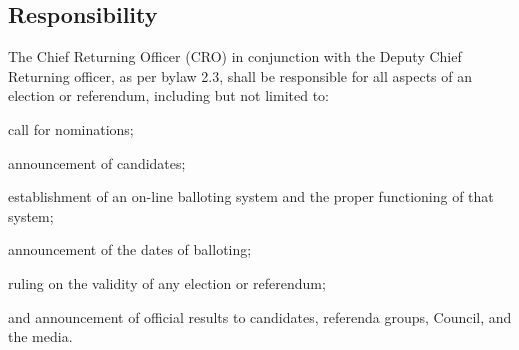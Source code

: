 \subsection{Responsibility}
\begin{longenum}[ label*=\thesubsection.\arabic*., align=left]
	\item The Chief Returning Officer (CRO) in conjunction with the Deputy Chief Returning  officer, as per bylaw 2.3, shall be responsible for all aspects of an election or referendum, including but not limited to:
    \begin{longenum}[ label*=\arabic*., align=left]
		\item call for nominations; 
        \item announcement of candidates;
        \item establishment of an on-line balloting system and the proper functioning of that system; 
        \item announcement of the dates of balloting; 
        \item ruling on the validity of any election or referendum;
        \item and announcement of official results to candidates, referenda groups, Council, and the media. 
	\end{longenum}
    
\end{longenum}

